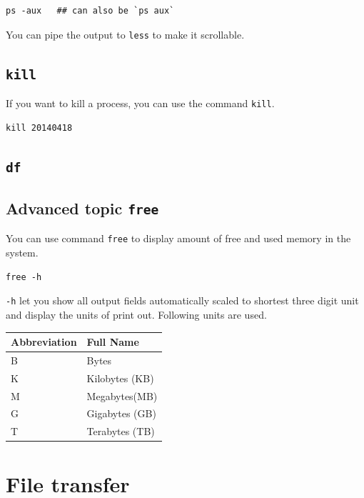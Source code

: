 \documentclass[]{book}
\begin{document}
\begin{verbatim}
ps -aux   ## can also be `ps aux`
\end{verbatim}

You can pipe the output to \texttt{less} to make it scrollable.

\hypertarget{kill}{%
\section{\texorpdfstring{\texttt{kill}}{kill}}\label{kill}}

If you want to kill a process, you can use the command \texttt{kill}.

\begin{verbatim}
kill 20140418
\end{verbatim}

\hypertarget{df}{%
\section{\texorpdfstring{\texttt{df}}{df}}\label{df}}

\hypertarget{advanced-topic-free}{%
\section{\texorpdfstring{Advanced topic \texttt{free}}{Advanced topic free}}\label{advanced-topic-free}}

You can use command \texttt{free} to display amount of free and used memory in the system.

\begin{verbatim}
free -h
\end{verbatim}

\texttt{-h} let you show all output fields automatically scaled to shortest three digit unit and display the units of print out. Following units are used.

\begin{longtable}[]{@{}ll@{}}
\toprule
Abbreviation & Full Name\tabularnewline
\midrule
\endhead
B & Bytes\tabularnewline
K & Kilobytes (KB)\tabularnewline
M & Megabytes(MB)\tabularnewline
G & Gigabytes (GB)\tabularnewline
T & Terabytes (TB)\tabularnewline
\bottomrule
\end{longtable}

\hypertarget{file-transfer}{%
\chapter{File transfer}\label{file-transfer}}
\end{document}
